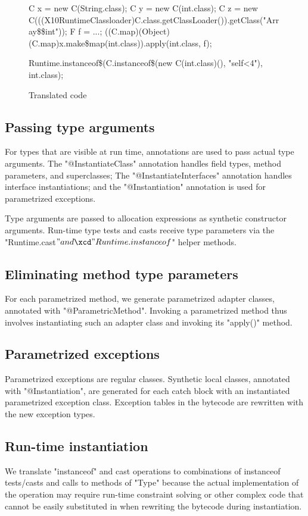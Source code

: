 {\begin{figure*}[tp]
{\begin{xten}
C x = new C(String.class);
C y = new C(int.class);
C z = new C(((X10RuntimeClassloader)C.class.getClassLoader()).getClass("Array\$\$int"));
F f = ...;
((C.map)(Object)(C.map)x.make\$map(int.class)).apply(int.class, f);

Runtime.instanceof\$(C.instanceof\$(new C(int.class)(), "self<4"), int.class);
\end{xten}}
\caption{Translated code}
\label{fig:translation2}
\end{figure*}
}

\subsection{Passing type arguments}

For types that are visible at run time, annotations are used to
pass actual type arguments.  The \xcd"@InstantiateClass"
annotation handles field types, method parameters, and
superclasses; The \xcd"@InstantiateInterfaces" annotation handles
interface instantiations; and the \xcd"@Instantiation" annotation
is used for parametrized exceptions.

Type arguments are passed to allocation expressions as
synthetic constructor arguments.  Run-time type tests and casts
receive type parameters via the \xcd"Runtime.cast$" and
\xcd"Runtime.instanceof$" helper methods.

\subsection{Eliminating method type parameters}

For each parametrized method, we generate parametrized
adapter classes, annotated with \xcd"@ParametricMethod".
Invoking a parametrized method thus involves
instantiating such an adapter class and invoking its
\xcd"apply()" method.

\subsection{Parametrized exceptions}

Parametrized exceptions are regular classes.
Synthetic local classes, annotated with \xcd"@Instantiation",
are generated for each catch block with an instantiated
parametrized exception class.  Exception tables in the
bytecode are rewritten with the new exception types.

\subsection{Run-time instantiation}

We translate \xcd"instanceof" and cast operations to combinations
of instanceof tests/casts and calls to
methods of \xcd"Type" because the actual implementation of
the operation may require run-time constraint solving or other
complex code that cannot be easily substituted in when rewriting
the bytecode during instantiation.
